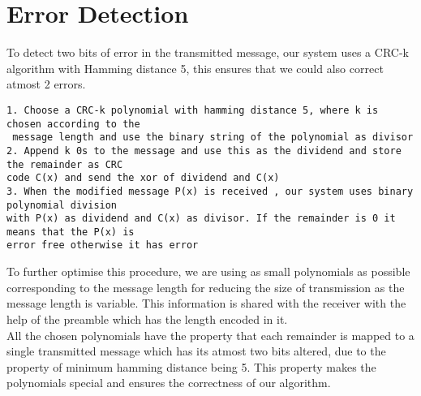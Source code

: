 \documentclass[11pt]{article}
\begin{document}
\section{Error Detection}
To detect two bits of error in the transmitted message, our system uses a CRC-k algorithm with Hamming distance 5, this ensures that we could also correct atmost 2 errors.
\begin{tcolorbox}[colback=black!10!white, colframe=black, title=Error Detection Algorithm ]
    \begin{verbatim}
1. Choose a CRC-k polynomial with hamming distance 5, where k is chosen according to the
 message length and use the binary string of the polynomial as divisor
2. Append k 0s to the message and use this as the dividend and store the remainder as CRC 
code C(x) and send the xor of dividend and C(x)
3. When the modified message P(x) is received , our system uses binary polynomial division
with P(x) as dividend and C(x) as divisor. If the remainder is 0 it means that the P(x) is 
error free otherwise it has error\end{verbatim}
\end{tcolorbox}
To further optimise this procedure, we are using as small polynomials as possible corresponding to the message length for reducing the size of transmission as the message length is variable. This information is shared with the receiver with the help of the preamble which has the length encoded in it. \\
All the chosen polynomials have the property that each remainder is mapped to a single transmitted message which has its atmost two bits altered, due to the property of minimum hamming distance being 5. This property makes the polynomials special and ensures the correctness of our algorithm.
\end{document}
